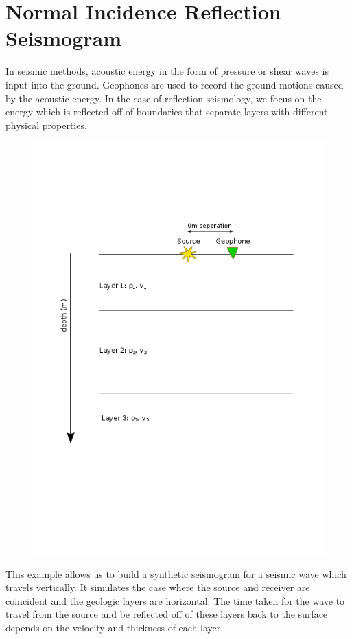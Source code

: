 \documentclass{article}[11pt,oneside]
\begin{document}

\section*{Normal Incidence Reflection Seismogram}
In seismic methods, acoustic energy in the form of pressure or shear waves is input into the ground.
Geophones are used to record the ground motions caused by the acoustic energy. In the case of reflection seismology, we focus on the energy which is reflected off of boundaries that separate layers with different physical properties.

\begin{figure}[H]
	\centering \includegraphics[width=\textwidth]{concept1.png}
\end{figure}


This example allows us to build a synthetic seismogram for a seismic wave which travels vertically. It simulates the case where the source and receiver are coincident and the geologic layers are horizontal. The time taken for the wave to travel from the source and be reflected off of these layers back to the surface depends on the velocity and thickness of each layer.
\end{document}
